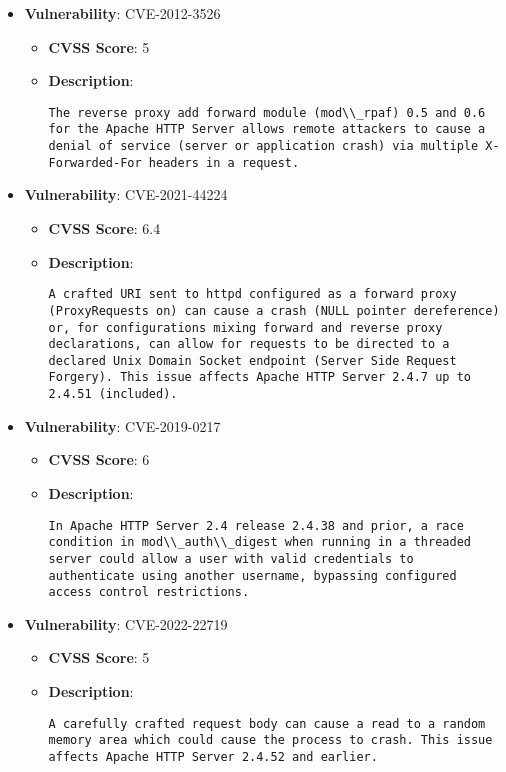 \documentclass{article}
\begin{document}
\begin{itemize}
        \item \textbf{Vulnerability}: CVE-2012-3526
        \begin{itemize}
            \item \textbf{CVSS Score}:  5 
            \item \textbf{Description}:
            \parbox[t]{0.9\linewidth}{
                \verb|The reverse proxy add forward module (mod\\_rpaf) 0.5 and 0.6 for the Apache HTTP Server allows remote attackers to cause a denial of service (server or application crash) via multiple X-Forwarded-For headers in a request.|
            }
        \end{itemize}
    
        \item \textbf{Vulnerability}: CVE-2021-44224
        \begin{itemize}
            \item \textbf{CVSS Score}:  6.4 
            \item \textbf{Description}:
            \parbox[t]{0.9\linewidth}{
                \verb|A crafted URI sent to httpd configured as a forward proxy (ProxyRequests on) can cause a crash (NULL pointer dereference) or, for configurations mixing forward and reverse proxy declarations, can allow for requests to be directed to a declared Unix Domain Socket endpoint (Server Side Request Forgery). This issue affects Apache HTTP Server 2.4.7 up to 2.4.51 (included).|
            }
        \end{itemize}
    
        \item \textbf{Vulnerability}: CVE-2019-0217
        \begin{itemize}
            \item \textbf{CVSS Score}:  6 
            \item \textbf{Description}:
            \parbox[t]{0.9\linewidth}{
                \verb|In Apache HTTP Server 2.4 release 2.4.38 and prior, a race condition in mod\\_auth\\_digest when running in a threaded server could allow a user with valid credentials to authenticate using another username, bypassing configured access control restrictions.|
            }
        \end{itemize}
    
        \item \textbf{Vulnerability}: CVE-2022-22719
        \begin{itemize}
            \item \textbf{CVSS Score}:  5 
            \item \textbf{Description}:
            \parbox[t]{0.9\linewidth}{
                \verb|A carefully crafted request body can cause a read to a random memory area which could cause the process to crash. This issue affects Apache HTTP Server 2.4.52 and earlier.|
            }
        \end{itemize}
    

\end{itemize}
\end{document}
